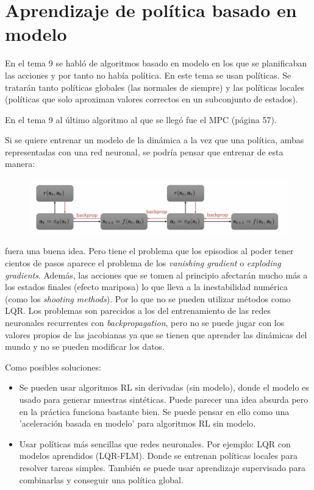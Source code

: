\chapter{Aprendizaje de política basado en modelo}%
\label{cha:aprendizaje_de_política_basado_en_modelo}


En el tema 9 se habló de algoritmos basado en modelo en los que se planificaban las
acciones y por tanto no había política. En este tema se usan políticas. Se tratarán tanto
políticas globales (las normales de siempre) y las políticas locales (políticas que solo
aproximan valores correctos en un subconjunto de estados).

En el tema 9 al último algoritmo al que se llegó fue el MPC (página 57).

Si se quiere entrenar un modelo de la dinámica a la vez que una política, ambas representadas
con una red neuronal, se podría pensar que entrenar de esta manera:
\begin{figure}[htpb]
	\centering
	\includegraphics[width=0.8\linewidth]{figures/2020-07-02-162725_920x197_scrot.png}
\end{figure}
fuera una buena idea. Pero tiene el problema que los episodios al poder tener cientos de
pasos aparece el problema de los \textit{vanishing gradient} o \textit{exploding
gradients}. Además, las acciones que se tomen al principio afectarán mucho más a los estados
finales (efecto mariposa) lo que lleva a la inestabilidad numérica (como los \textit{shooting
methods}). Por lo que no se pueden utilizar métodos como LQR. Los problemas son parecidos a los
del entrenamiento de las redes neuronales recurrentes con
\textit{backpropagation}, pero no se puede jugar con los valores propios de las jacobianas ya
que se tienen que aprender las dinámicas del mundo y no se pueden modificar los datos.

Como posibles soluciones:
\begin{itemize}
    \item Se pueden usar algoritmos RL sin derivadas (sin modelo), donde el modelo es usado para
        generar muestras sintéticas. Puede parecer una idea absurda pero en la práctica funciona
        bastante bien. Se puede pensar en ello como una 'aceleración basada en modelo' para
        algoritmos RL sin modelo.
    \item Usar políticas más sencillas que redes neuronales. Por ejemplo: LQR con modelos
        aprendidos (LQR-FLM). Donde se entrenan políticas locales para resolver tareas
        simples. También se puede usar aprendizaje supervisado para combinarlas y
        conseguir una política global.
\end{itemize}

